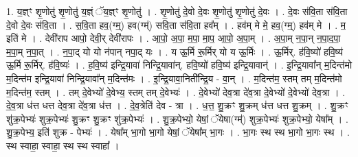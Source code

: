 \documentclass[17pt]{extarticle}
\begin{document}
1. य॒ज्ञ्ꣳ शृ॒णोतु॑ शृ॒णोतु॑ य॒ज्ञ्ं ॅय॒ज्ञ्ꣳ शृ॒णोतु॑ । . शृ॒णोतु॑ दे॒वो दे॒वः शृ॒णोतु॑ शृ॒णोतु॑ दे॒वः । . दे॒वः स॑वि॒ता स॑वि॒ता दे॒वो दे॒वः स॑वि॒ता । . स॒वि॒ता हव॒(ग्म्॒) हव(ग्म्॑) सवि॒ता स॑वि॒ता हव᳚म् । . हव॑म् मे मे॒ हव॒(ग्म्॒) हव॑म् मे । . म॒ इति॑ मे । . देवी॑राप आपो॒ देवी॒र् देवी॑रापः । . आ॒पो॒ अ॒पा॒ म॒पा॒ मा॒प॒ आ॒पो॒ अ॒पा॒म् । . अ॒पा॒म् न॒पा॒न् न॒पा॒द॒पा॒ म॒पा॒म् न॒पा॒त् । . न॒पा॒द् यो यो न॑पान् नपा॒द् यः । . य ऊ॒र्मि रू॒र्मिर् यो य ऊ॒र्मिः । . ऊ॒र्मिर्. ह॑वि॒ष्यो॑ हवि॒ष्य॑ ऊ॒र्मि रू॒र्मिर्. ह॑वि॒ष्यः॑ । . ह॒वि॒ष्य॑ इन्द्रि॒यावा॑ निन्द्रि॒यावा॑न्. हवि॒ष्यो॑ हवि॒ष्य॑ इन्द्रि॒यावान्॑ । . इ॒न्द्रि॒यावा᳚न् म॒दिन्त॑मो म॒दिन्त॑म इन्द्रि॒यावा॑ निन्द्रि॒यावा᳚न् म॒दिन्त॑मः । . इ॒न्द्रि॒यावा॒निती᳚न्द्रि॒य - वा॒न् । . म॒दिन्त॑म॒ स्तम् तम् म॒दिन्त॑मो म॒दिन्त॑म॒ स्तम् । . तम् दे॒वेभ्यो॑ दे॒वेभ्य॒ स्तम् तम् दे॒वेभ्यः॑ । . दे॒वेभ्यो॑ देव॒त्रा दे॑व॒त्रा दे॒वेभ्यो॑ दे॒वेभ्यो॑ देव॒त्रा । . दे॒व॒त्रा ध॑त्त धत्त देव॒त्रा दे॑व॒त्रा ध॑त्त । . दे॒व॒त्रेति॑ देव - त्रा । . ध॒त्त॒ शु॒क्रꣳ शु॒क्रम् ध॑त्त धत्त शु॒क्रम् । . शु॒क्रꣳ शु॑क्र॒पेभ्यः॑ शुक्र॒पेभ्यः॑ शु॒क्रꣳ शु॒क्रꣳ शु॑क्र॒पेभ्यः॑ । . शु॒क्र॒पेभ्यो॒ येषां॒ ॅयेषा(ग्म्॑) शुक्र॒पेभ्यः॑ शुक्र॒पेभ्यो॒ येषा᳚म् । . शु॒क्र॒पेभ्य॒ इति॑ शुक्र - पेभ्यः॑ । . येषा᳚म् भा॒गो भा॒गो येषां॒ ॅयेषा᳚म् भा॒गः । . भा॒गः स्थ स्थ भा॒गो भा॒गः स्थ । . स्थ स्वाहा॒ स्वाहा॒ स्थ स्थ स्वाहा᳚ । \newline
\end{document}
